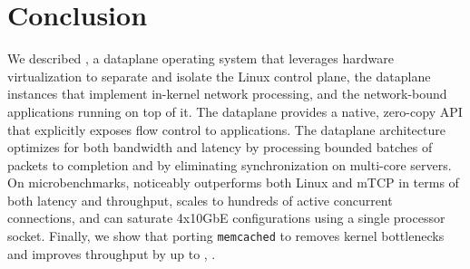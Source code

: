 
\section{Conclusion}

We described \ix, a dataplane operating system that leverages hardware
virtualization to separate and isolate the Linux control plane, the
\ix dataplane instances that implement in-kernel network processing,
and the network-bound applications running on top of it.  The \ix
dataplane provides a native, zero-copy API that explicitly exposes
flow control to applications. The dataplane architecture optimizes for
both bandwidth and latency by processing bounded batches of packets to
completion and by eliminating synchronization on multi-core
servers. On microbenchmarks, \ix noticeably outperforms both Linux and
mTCP in terms of both latency and throughput, scales to hundreds of
active concurrent connections, and can saturate 4x10GbE configurations
using a single processor socket.  Finally, we show that porting
\texttt{memcached} to \ix removes kernel bottlenecks and improves
throughput by up to \usrspeedup, .


